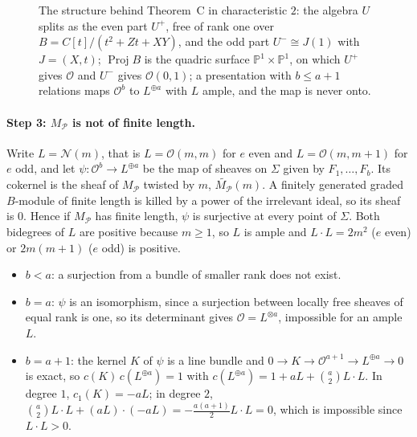 \documentclass[11pt]{article}
\theoremstyle{definition}
\theoremstyle{remark}
\begin{document}
\begin{figure}[htbp]
\centering

\caption{The structure behind Theorem~C in characteristic $2$: the algebra $U$ splits as the even part $U^+$, free of rank one over $B=C[t]/(t^2+Zt+XY)$, and the odd part $U^-\cong J(1)$ with $J=(X,t)$; $\operatorname{Proj}B$ is the quadric surface $\mathbb P^1\times\mathbb P^1$, on which $U^+$ gives $\mathcal O$ and $U^-$ gives $\mathcal O(0,1)$; a presentation with $b\le a+1$ relations maps $\mathcal O^b$ to $L^{\oplus a}$ with $L$ ample, and the map is never onto.}
\label{fig:char2}
\end{figure}

\paragraph{Step 3: $M_{\mathcal P}$ is not of finite length.} Write $L=\mathcal N(m)$, that is $L=\mathcal O(m,m)$ for $e$ even and $L=\mathcal O(m,m+1)$ for $e$ odd, and let $\psi:\mathcal O^b\to L^{\oplus a}$ be the map of sheaves on $\Sigma$ given by $F_1,\dots,F_b$. Its cokernel is the sheaf of $M_{\mathcal P}$ twisted by $m$, $\widetilde{M_{\mathcal P}}(m)$. A finitely generated graded $B$-module of finite length is killed by a power of the irrelevant ideal, so its sheaf is $0$. Hence if $M_{\mathcal P}$ has finite length, $\psi$ is surjective at every point of $\Sigma$. Both bidegrees of $L$ are positive because $m\ge1$, so $L$ is ample and $L\cdot L=2m^2$ ($e$ even) or $2m(m+1)$ ($e$ odd) is positive.
\begin{itemize}
\item $b<a$: a surjection from a bundle of smaller rank does not exist.
\item $b=a$: $\psi$ is an isomorphism, since a surjection between locally free sheaves of equal rank is one, so its determinant gives $\mathcal O=L^{\otimes a}$, impossible for an ample $L$.
\item $b=a+1$: the kernel $K$ of $\psi$ is a line bundle and $0\to K\to\mathcal O^{a+1}\to L^{\oplus a}\to0$ is exact, so $c(K)\,c(L^{\oplus a})=1$ with $c(L^{\oplus a})=1+aL+\binom a2L\cdot L$. In degree $1$, $c_1(K)=-aL$; in degree $2$, $\binom a2L\cdot L+(aL)\cdot(-aL)=-\tfrac{a(a+1)}2L\cdot L=0$, which is impossible since $L\cdot L>0$.
\end{itemize}
\end{document}
